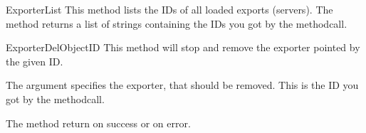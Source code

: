 \begin{methoddesc}[Core]{ExporterList}{}
This method lists the IDs of all loaded exports (servers). The method returns
a list of strings containing the IDs you got by the 
methodcall. 
\end{methoddesc}

\begin{methoddesc}[Core]{ExporterDel}{ObjectID}
This method will stop and remove the exporter pointed by the given ID. 

The argument  specifies the exporter, that should be removed.
This is the ID you got by the  methodcall.

The method return  on success or  on error.
\end{methoddesc}
